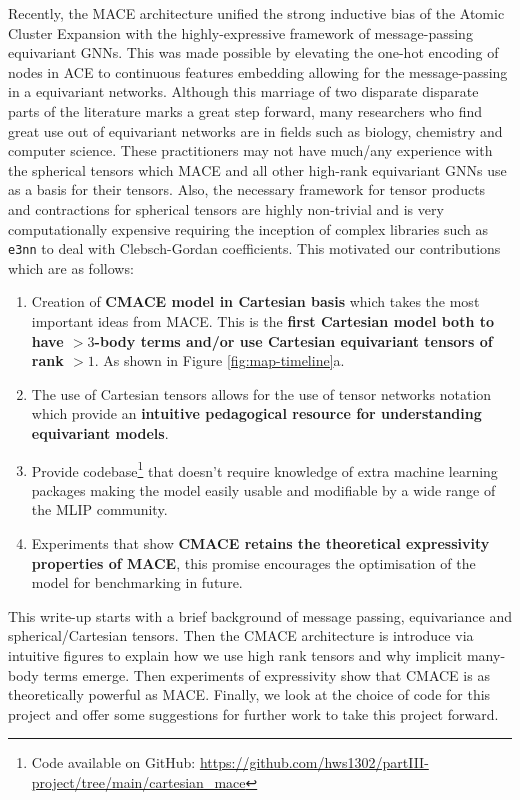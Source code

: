 Recently, the MACE architecture \cite{batatia2022mace} unified the strong inductive bias of the Atomic Cluster Expansion with the highly-expressive framework of message-passing equivariant GNNs. This was made possible by elevating the one-hot encoding of nodes in ACE to continuous features embedding allowing for the message-passing in a equivariant networks. Although this marriage of two disparate disparate parts of the literature marks a great step forward, many researchers who find great use out of equivariant networks are in fields such as biology, chemistry and computer science. These practitioners may not have much/any experience with the spherical tensors which MACE and all other high-rank equivariant GNNs use as a basis for their tensors. Also, the necessary framework for tensor products and contractions for spherical tensors are highly non-trivial and is very computationally expensive requiring the inception of complex libraries such as \texttt{e3nn} to deal with Clebsch-Gordan coefficients. This motivated our contributions which are as follows: 

\begin{enumerate}
    \item Creation of \textbf{CMACE model in Cartesian basis} which takes the most important ideas from MACE. This is the \textbf{first Cartesian model both to have $>3$-body terms and/or use Cartesian equivariant tensors of rank $>1$}. As shown in Figure \ref{fig:map-timeline}a.
    \item The use of Cartesian tensors allows for the use of tensor networks notation which provide an \textbf{intuitive pedagogical resource for understanding equivariant models}.
    \item Provide codebase\footnote{Code available on GitHub: \url{https://github.com/hws1302/partIII-project/tree/main/cartesian_mace}} that doesn't require knowledge of extra machine learning packages making the model easily usable and modifiable by a wide range of the MLIP community.
    \item Experiments that show \textbf{CMACE retains the theoretical expressivity properties of MACE}, this promise encourages the optimisation of the model for benchmarking in future.
\end{enumerate}
 

This write-up starts with a brief background of message passing, equivariance and spherical/Cartesian tensors. Then the CMACE architecture is introduce via intuitive figures to explain how we use high rank tensors and why implicit many-body terms emerge. Then experiments of expressivity show that CMACE is as theoretically powerful as MACE. Finally, we look at the choice of code for this project and offer some suggestions for further work to take this project forward. 

